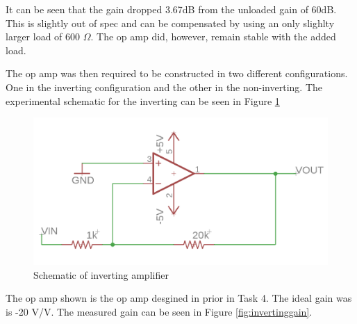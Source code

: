 It can be seen that the gain dropped 3.67dB from the unloaded gain of 60dB. This is slightly out of spec and can be compensated by using an only slighlty larger load of 600 $\Omega$. The op amp did, however, remain stable with the added load.
	
	
The op amp was then required to be constructed in two different configurations. One in the inverting configuration and the other in the non-inverting. The experimental schematic for the inverting can be seen in Figure \ref{fig:invertingschem}

		\begin{figure}[H]
	\begin{center}
		\includegraphics[scale=.40]{ExperimentalImplementation/invertingschem.png}
		\caption{Schematic of inverting amplifier}
		\label{fig:invertingschem}
	\end{center}
\end{figure}

The op amp shown is the op amp desgined in prior in Task 4. The ideal gain was is -20 V/V. The measured gain can be seen in Figure \ref{fig:invertinggain}.
	
	
	
